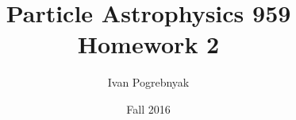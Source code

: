 \documentclass[12pt]{article}
\title{Particle Astrophysics 959 Homework 2}
\author{Ivan Pogrebnyak}
\date{Fall 2016}
\begin{document}
\maketitle


\section{}


\section{}


\section{}


\section{}


\section{}


\section{}


\section{}


\section{}

\end{document}
